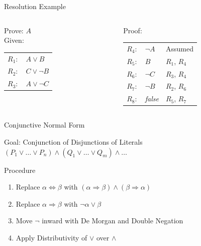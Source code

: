 \documentclass[14pt]{beamer}
\newcommand{\limpl}{\Rightarrow}
\newcommand{\liff}{\Leftrightarrow}
\begin{document}
\begin{frame}{Resolution Example}
	\begin{columns}[t]
		\begin{column}{1.5in}
			Prove: $A$ \\[1em]
			Given: \\
			\begin{tabular}{ll}
				$R_1\!\!:$ & $A \lor B$ \\
				$R_2\!\!:$ & $C \lor \lnot B$ \\
				$R_3\!\!:$ & $A \lor \lnot C$ \\
			\end{tabular}
		\end{column}
		\begin{column}{2.5in}
			Proof: \\[1em]
			\begin{tabular}{lll}
				\pause
				$R_4\!\!:$    & $\lnot A$         & Assumed \\
				\pause
				$R_5\!\!:$    & $B$               & $R_1$, $R_4$ \\
				\pause
				$R_6\!\!:$    & $\lnot C$         & $R_3$, $R_4$ \\
				\pause
				$R_7\!\!:$    & $\lnot B$         & $R_2$, $R_6$ \\
				\pause
				$R_8\!\!:$    & \emph{false}      & $R_5$, $R_7$ \\
			\end{tabular}
		\end{column}
	\end{columns}
\end{frame}
\begin{frame}{Conjunctive Normal Form}
	\begin{block}{Goal: Conjunction of Disjunctions of Literals}
		$(P_1 \lor \ldots \lor P_n) \land (Q_1 \lor \ldots \lor Q_m) \land \ldots$
	\end{block}
	\begin{block}{Procedure}
		\begin{enumerate}
			\item Replace $\alpha \liff \beta$ with $(\alpha\limpl \beta)\land (\beta\limpl \alpha)$
			\item Replace $\alpha \limpl \beta$ with $\lnot\alpha \lor \beta$
			\item Move $\lnot$ inward with De Morgan and Double Negation
			\item Apply Distributivity of $\lor$ over $\land$
		\end{enumerate}
	\end{block}
\end{frame}
\end{document}
